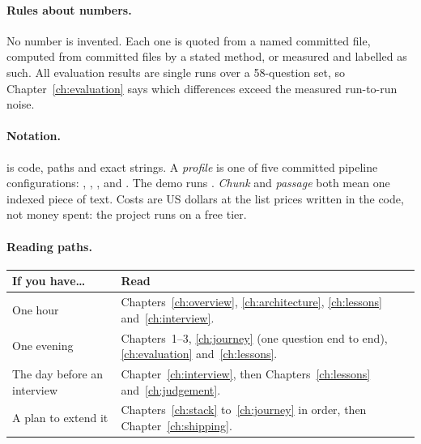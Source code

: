 \paragraph{Rules about numbers.} No number is invented. Each one is quoted from a named committed file, computed from committed files by a stated method, or measured and labelled as such. All evaluation results are single runs over a 58-question set, so Chapter~\ref{ch:evaluation} says which differences exceed the measured run-to-run noise.

\paragraph{Notation.}  is code, paths and exact strings. A \emph{profile} is one of five committed pipeline configurations: , , ,  and . The demo runs . \emph{Chunk} and \emph{passage} both mean one indexed piece of text. Costs are US dollars at the list prices written in the code, not money spent: the project runs on a free tier.

\paragraph{Reading paths.}
\begin{center}\small
\begin{tabularx}{\textwidth}{@{}p{4.0cm}L@{}}
\toprule
\textbf{If you have\ldots} & \textbf{Read}\\
\midrule
One hour & Chapters~\ref{ch:overview}, \ref{ch:architecture}, \ref{ch:lessons} and~\ref{ch:interview}.\\
One evening & Chapters~1--3, \ref{ch:journey} (one question end to end), \ref{ch:evaluation} and~\ref{ch:lessons}.\\
The day before an interview & Chapter~\ref{ch:interview}, then Chapters~\ref{ch:lessons} and~\ref{ch:judgement}.\\
A plan to extend it & Chapters~\ref{ch:stack} to~\ref{ch:journey} in order, then Chapter~\ref{ch:shipping}.\\
\bottomrule
\end{tabularx}
\end{center}
